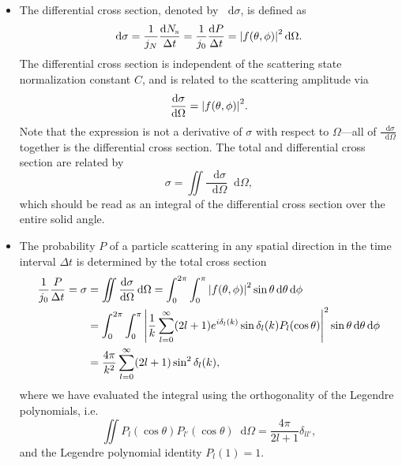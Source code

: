 \documentclass[11pt, a4paper]{article}
\newcommand{\diff}{\mathop{}\!\mathrm{d}} %
\begin{document}
\begin{itemize}
    \item The differential cross section, denoted by $ \diff \sigma $, is defined as
    \begin{equation*}
        \diff \sigma = \frac{1}{j_{N}} \frac{\diff N_{\text{s}}}{\Delta t} = \frac{1}{j_{0}} \frac{\diff P}{\Delta t} = \abs{f(\theta, \phi)}^{2} \diff \Omega.
    \end{equation*}
    The differential cross section is independent of the scattering state normalization constant $ C $, and is related to the scattering amplitude via
    \begin{equation*}
        \frac{\diff \sigma}{\diff \Omega} = \abs{f(\theta, \phi)}^{2}.
    \end{equation*}
    Note that the expression is not a derivative of $ \sigma $ with respect to $ \Omega $---all of $ \frac{\diff \sigma}{\diff \Omega}  $ together is the differential cross section. The total and differential cross section are related by
    \begin{equation*}
        \sigma = \iint \frac{\diff \sigma}{\diff \Omega} \diff \Omega,
    \end{equation*}
    which should be read as an integral of the differential cross section over the entire solid angle. 
    
    \item The probability $ P $ of a particle scattering in any spatial direction in the time interval $ \Delta t $ is determined by the total cross section
    \begin{align*}
        \frac{1}{j_{0}}\frac{P}{\Delta t} = \sigma &= \iint \frac{\diff \sigma}{\diff \Omega} \diff \Omega = \int_{0}^{2\pi}\int_{0}^{\pi} \abs{f(\theta, \phi)}^{2} \sin \theta \diff \theta \diff \phi \\
        & = \int_{0}^{2\pi}\int_{0}^{\pi} \abs{\frac{1}{k} \sum_{l = 0}^{\infty} (2l + 1)e^{i\delta_{l}(k)} \sin \delta_{l}(k) P_{l}(\cos \theta)}^{2} \sin \theta \diff \theta \diff \phi \\
        & = \frac{4\pi}{k^{2}} \sum_{l = 0}^{\infty} (2l + 1) \sin^{2}\delta_{l}(k),
    \end{align*}
    where we have evaluated the integral using the orthogonality of the Legendre polynomials, i.e.
    \begin{equation*}
        \iint P_{l}(\cos \theta) P_{l'}(\cos \theta) \diff \Omega = \frac{4 \pi}{2l + 1}\delta_{ll'},
    \end{equation*}
    and the Legendre polynomial identity $ P_{l}(1) = 1 $.


\end{itemize}
\end{document}
